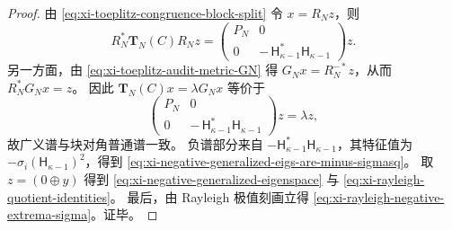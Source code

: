 \begin{proof}
由 \eqref{eq:xi-toeplitz-congruence-block-split} 令 \(x=R_N z\)，则
\[
R_N^{\ast}\mathbf{T}_N(C)R_N z
=
\begin{pmatrix}
P_N & 0\\
0 & -\,\mathsf H_{\kappa-1}^{\ast}\mathsf H_{\kappa-1}
\end{pmatrix}z.
\]
另一方面，由 \eqref{eq:xi-toeplitz-audit-metric-GN} 得
\(
G_N x=R_N^{-*}z
\)，从而
\(
R_N^{\ast}G_N x=z
\)。
因此 \(\mathbf{T}_N(C)x=\lambda G_N x\) 等价于
\[
\begin{pmatrix}
P_N & 0\\
0 & -\,\mathsf H_{\kappa-1}^{\ast}\mathsf H_{\kappa-1}
\end{pmatrix}z
=\lambda z,
\]
故广义谱与块对角普通谱一致。
负谱部分来自 \(-\mathsf H_{\kappa-1}^{\ast}\mathsf H_{\kappa-1}\)，其特征值为 \(-\sigma_i(\mathsf H_{\kappa-1})^2\)，得到 \eqref{eq:xi-negative-generalized-eigs-are-minus-sigmasq}。
取 \(z=(0\oplus y)\) 得到 \eqref{eq:xi-negative-generalized-eigenspace} 与 \eqref{eq:xi-rayleigh-quotient-identities}。
最后，由 Rayleigh 极值刻画立得 \eqref{eq:xi-rayleigh-negative-extrema-sigma}。证毕。
\end{proof}

